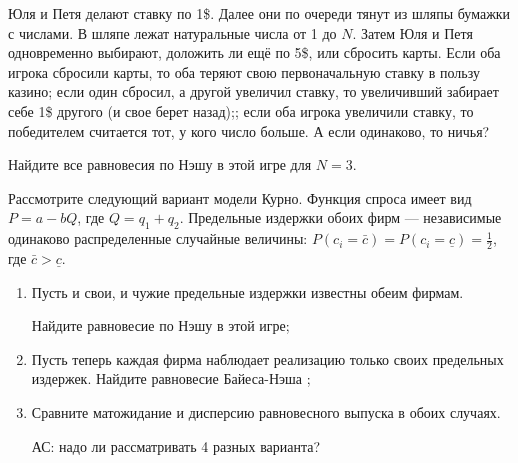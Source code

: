 \begin{problem}
Юля и Петя делают ставку по 1\$. Далее они по очереди тянут из шляпы бумажки с числами. В шляпе лежат натуральные числа от 1 до  $N$. Затем Юля и Петя одновременно выбирают, доложить ли ещё по 5\$, или сбросить карты. Если оба игрока сбросили карты, то оба теряют свою первоначальную ставку в пользу казино; если один сбросил, а другой увеличил ставку, то увеличивший забирает себе 1\$ другого (и свое берет назад);; если оба игрока увеличили ставку, то победителем считается тот, у кого число больше. {\red А если одинаково, то ничья?}\par
Найдите все равновесия по Нэшу в этой игре для  $N=3$.\par



\begin{sol}

\end{sol}
\end{problem}



\begin{problem}
\begin{source}
\cite{colell:mt}
\end{source}
Рассмотрите следующий вариант модели Курно. Функция спроса имеет вид  $P=a-bQ$, где  $Q=q_{1} +q_{2} $. Предельные издержки обоих фирм --- независимые одинаково распределенные случайные величины:  $P\left(c_{i} =\bar{c}\right)=P\left(c_{i} =\underline{c}\right)=\frac{1}{2} $, где  $\bar{c}>\underline{c}$.\par

\begin{enumerate}
\item	
Пусть и свои, и чужие предельные издержки известны обеим фирмам.\par
Найдите равновесие по Нэшу в этой игре;\par

\item Пусть теперь каждая фирма наблюдает реализацию только своих предельных издержек.
	Найдите равновесие Байеса-Нэша  ;\par
\item 	Сравните матожидание и дисперсию равновесного выпуска в обоих случаях.\par

{\red АС: надо ли рассматривать 4 разных варианта?}
\end{enumerate}


\begin{sol}

\end{sol}
\end{problem}






